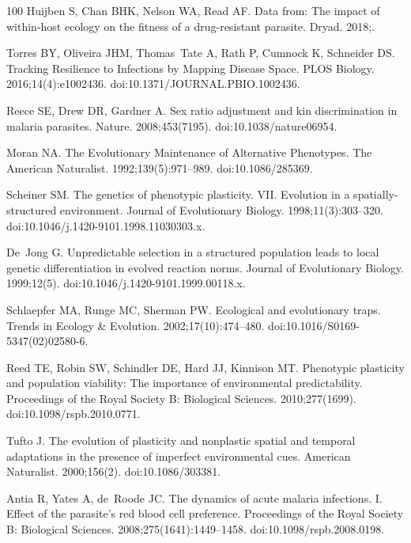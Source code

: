 \documentclass[10pt,letterpaper]{article}
\begin{document}
\begin{thebibliography}{100}
Huijben S, Chan BHK, Nelson WA, Read AF.
\newblock Data from: {The} impact of within-host ecology on the fitness of a drug-resistant parasite.
\newblock Dryad. 2018;.

Torres BY, Oliveira JHM, Thomas~Tate A, Rath P, Cumnock K, Schneider DS.
\newblock Tracking {Resilience} to {Infections} by {Mapping} {Disease} {Space}.
\newblock PLOS Biology. 2016;14(4):e1002436.
\newblock doi:{10.1371/JOURNAL.PBIO.1002436}.

Reece SE, Drew DR, Gardner A.
\newblock Sex ratio adjustment and kin discrimination in malaria parasites.
\newblock Nature. 2008;453(7195).
\newblock doi:{10.1038/nature06954}.

Moran NA.
\newblock The {Evolutionary} {Maintenance} of {Alternative} {Phenotypes}.
\newblock The American Naturalist. 1992;139(5):971--989.
\newblock doi:{10.1086/285369}.

Scheiner SM.
\newblock The genetics of phenotypic plasticity. {VII}. {Evolution} in a spatially-structured environment.
\newblock Journal of Evolutionary Biology. 1998;11(3):303--320.
\newblock doi:{10.1046/j.1420-9101.1998.11030303.x}.

De~Jong G.
\newblock Unpredictable selection in a structured population leads to local genetic differentiation in evolved reaction norms.
\newblock Journal of Evolutionary Biology. 1999;12(5).
\newblock doi:{10.1046/j.1420-9101.1999.00118.x}.

Schlaepfer MA, Runge MC, Sherman PW.
\newblock Ecological and evolutionary traps.
\newblock Trends in Ecology \& Evolution. 2002;17(10):474--480.
\newblock doi:{10.1016/S0169-5347(02)02580-6}.

Reed TE, Robin SW, Schindler DE, Hard JJ, Kinnison MT.
\newblock Phenotypic plasticity and population viability: {The} importance of environmental predictability.
\newblock Proceedings of the Royal Society B: Biological Sciences. 2010;277(1699).
\newblock doi:{10.1098/rspb.2010.0771}.

Tufto J.
\newblock The evolution of plasticity and nonplastic spatial and temporal adaptations in the presence of imperfect environmental cues.
\newblock American Naturalist. 2000;156(2).
\newblock doi:{10.1086/303381}.

Antia R, Yates A, de~Roode JC.
\newblock The dynamics of acute malaria infections. {I}. {Effect} of the parasite's red blood cell preference.
\newblock Proceedings of the Royal Society B: Biological Sciences. 2008;275(1641):1449--1458.
\newblock doi:{10.1098/rspb.2008.0198}.


\end{thebibliography}
\end{document}
